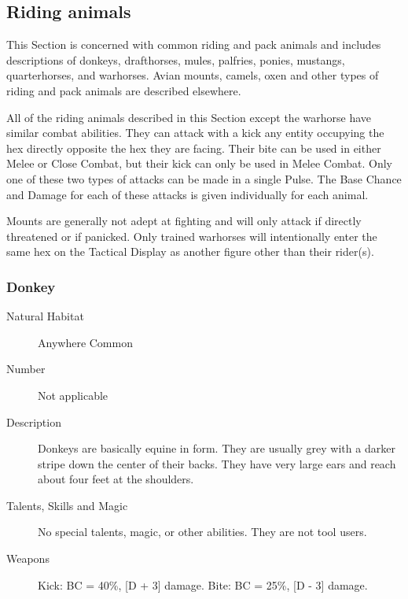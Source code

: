 \begin{multicols*}{2}

\setlength\columnseprule{0.2mm}

\section{Riding animals}
This Section is concerned with common riding and pack animals and
includes descriptions of donkeys, drafthorses, mules, palfries,
ponies, mustangs, quarterhorses, and warhorses.  Avian mounts, camels,
oxen and other types of riding and pack animals are described
elsewhere.

All of the riding animals described in this Section except the
warhorse have similar combat abilities.  They can attack with a kick
any entity occupying the hex directly opposite the hex they are
facing.  Their bite can be used in either Melee or Close Combat, but
their kick can only be used in Melee Combat.  Only one of these two
types of attacks can be made in a single Pulse.  The Base Chance and
Damage for each of these attacks is given individually for each
animal.

Mounts are generally not adept at fighting and will only attack if
directly threatened or if panicked.  Only trained warhorses will
intentionally enter the same hex on the Tactical Display as another
figure other than their rider(s).

\subsubsection{Donkey}

\begin{description}
\item[Natural Habitat]  Anywhere Common

\item[Number] Not applicable

\item[Description] Donkeys are basically equine in form. They are usually
grey with a darker stripe down the center of their backs.  They have
very large ears and reach about four feet at the shoulders.

\item[Talents, Skills and Magic] No special talents, magic, or other abilities. They are not
tool users.

\item[Weapons] Kick: BC = 40\%, [D + 3] damage. Bite: BC = 25\%, [D - 3] damage.


\end{description}
\end{multicols*}
